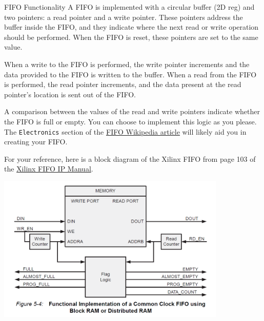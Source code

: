 \documentclass[11pt]{article}
\makeatletter
\renewcommand{\subsection}
{\@startsection {subsection}{1}{0pt}
 {-1ex}
 {0.5ex}
 {\bfseries\normalsize}}
\makeatother
\begin{document}
\subsection{FIFO Functionality}
A FIFO is implemented with a circular buffer (2D reg) and two pointers: a read pointer and a write pointer.
These pointers address the buffer inside the FIFO, and they indicate where the next read or write operation should be performed.
When the FIFO is reset, these pointers are set to the same value.

When a write to the FIFO is performed, the write pointer increments and the data provided to the FIFO is written to the buffer.
When a read from the FIFO is performed, the read pointer increments, and the data present at the read pointer's location is sent out of the FIFO.

A comparison between the values of the read and write pointers indicate whether the FIFO is full or empty.
You can choose to implement this logic as you please.
The \verb|Electronics| section of the \href{https://en.wikipedia.org/wiki/FIFO_(computing_and_electronics)}{FIFO Wikipedia article} will likely aid you in creating your FIFO.

For your reference, here is a block diagram of the Xilinx FIFO from page 103 of the \href{https://www.xilinx.com/support/documentation/ip_documentation/fifo_generator_ug175.pdf}{Xilinx FIFO IP Manual}.

\begin{center}
    \includegraphics[height=7cm]{figs/sync_fifo_diagram.png}
\end{center}
\end{document}
